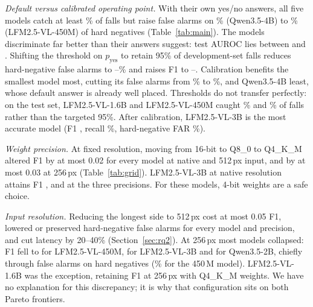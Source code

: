 \begin{table}[t]
\centering
\caption{Prompts at the default operating point (test set, Q8\_0, native resolution, one frame). Recall and false-alarm rates (FAR) in \%.}
\label{tab:prompts}
\footnotesize
\setlength{\tabcolsep}{3pt}
\end{table}

\textit{Default versus calibrated operating point.} With their own yes/no answers, all five models catch at least \RQwenSDefRecall\% of falls but raise false alarms on \RQwenLDefFarHard\% (Qwen3.5-4B) to \RLfmSDefFarHard\% (LFM2.5-VL-450M) of hard negatives (Table~\ref{tab:main}). The models discriminate far better than their answers suggest: test AUROC lies between \RLfmSAuroc{} and \RLfmLAuroc. Shifting the threshold on $p_\text{yes}$ to retain 95\% of development-set falls reduces hard-negative false alarms to \RLfmMCalFarHard--\RLfmSCalFarHard\% and raises F1 to \RLfmSCalFone--\RLfmLCalFone. Calibration benefits the smallest model most, cutting its false alarms from \RLfmSDefFarHard\% to \RLfmSCalFarHard\%, and Qwen3.5-4B least, whose default answer is already well placed. Thresholds do not transfer perfectly: on the test set, LFM2.5-VL-1.6B and LFM2.5-VL-450M caught \RLfmMCalRecall\% and \RLfmSCalRecall\% of falls rather than the targeted 95\%. After calibration, LFM2.5-VL-3B is the most accurate model (F1 \RLfmLCalFone, recall \RLfmLCalRecall\%, hard-negative FAR \RLfmLCalFarHard\%).

\begin{table}[t]
\centering
\caption{Default and calibrated operating points (test set, Q8\_0, native resolution, one frame, prompt~A). Recall and hard-negative false-alarm rate (FAR$_\text{hard}$) in \% with 95\% confidence intervals.}
\label{tab:main}
\footnotesize
{}
\end{table}

\textit{Weight precision.} At fixed resolution, moving from 16-bit to Q8\_0 to Q4\_K\_M altered F1 by at most 0.02 for every model at native and 512\,px input, and by at most 0.03 at 256\,px (Table~\ref{tab:grid}). LFM2.5-VL-3B at native resolution attains F1 \CLfmLHalfNatOneFone, \CLfmLQeightNatOneFone{} and \CLfmLQfourNatOneFone{} at the three precisions. For these models, 4-bit weights are a safe choice.

\textit{Input resolution.} Reducing the longest side to 512\,px cost at most 0.05 F1, lowered or preserved hard-negative false alarms for every model and precision, and cut latency by 20--40\% (Section~\ref{sec:rq2}). At 256\,px most models collapsed: F1 fell to \CLfmSQeightTwofiftysixOneFone{} for LFM2.5-VL-450M, \CLfmLQeightTwofiftysixOneFone{} for LFM2.5-VL-3B and \CQwenSQeightTwofiftysixOneFone{} for Qwen3.5-2B, chiefly through false alarms on hard negatives (\CLfmSQeightTwofiftysixOneFarHard\% for the 450\,M model). LFM2.5-VL-1.6B was the exception, retaining F1 \CLfmMQfourTwofiftysixOneFone{} at 256\,px with Q4\_K\_M weights. We have no explanation for this discrepancy; it is why that configuration sits on both Pareto frontiers.

